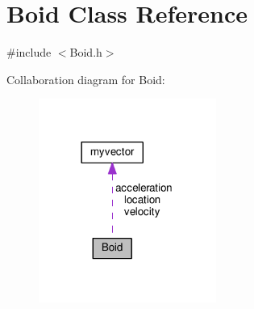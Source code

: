 \hypertarget{classBoid}{}\section{Boid Class Reference}
\label{classBoid}


{\ttfamily \#include $<$Boid.\+h$>$}



Collaboration diagram for Boid\+:\nopagebreak
\begin{figure}[H]
\begin{center}
\leavevmode
\includegraphics[width=165pt]{classBoid__coll__graph}
\end{center}
\end{figure}
